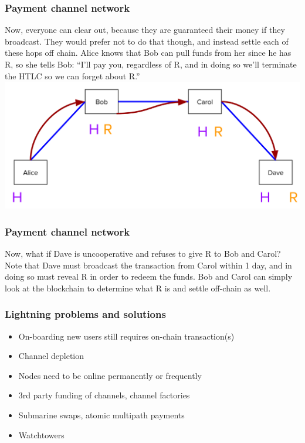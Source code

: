 \documentclass{beamer}
\begin{document}
\begin{frame}
\frametitle{Payment channel network}
Now, everyone can clear out, because they are guaranteed their money if they broadcast. They would prefer not to do that though, and instead settle each of these hops off chain. Alice knows that Bob can pull funds from her since he has R, so she tells Bob: “I’ll pay you, regardless of R, and in doing so we’ll terminate the HTLC so we can forget about R.” 
\includegraphics[scale=0.12]{images/network4.png}

\end{frame}
\begin{frame}
\frametitle{Payment channel network}
Now, what if Dave is uncooperative and refuses to give R to Bob and Carol? Note that Dave must broadcast the transaction from Carol within 1 day, and in doing so must reveal R in order to redeem the funds. Bob and Carol can simply look at the blockchain to determine what R is and settle off-chain as well.
\end{frame}

\begin{frame}
\frametitle{Lightning problems and solutions}
\begin{itemize}
\item On-boarding new users still requires on-chain transaction(s)
\item Channel depletion
\item Nodes need to be online permanently or frequently
\end{itemize}
\begin{itemize}
\item 3rd party funding of channels, channel factories
\item Submarine swaps, atomic multipath payments
\item Watchtowers
\end{itemize}
\end{frame}
\end{document}

